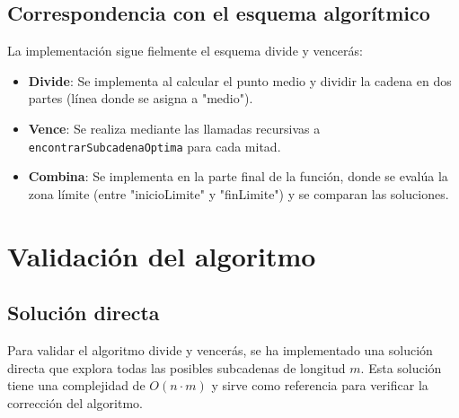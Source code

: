 \documentclass[12pt,a4paper]{article}
\begin{document}
\subsection{Correspondencia con el esquema algorítmico}
La implementación sigue fielmente el esquema divide y vencerás:
\begin{itemize}
    \item \textbf{Divide}: Se implementa al calcular el punto medio y dividir la cadena en dos partes (línea donde se asigna a "medio").
    \item \textbf{Vence}: Se realiza mediante las llamadas recursivas a \texttt{encontrarSubcadenaOptima} para cada mitad.
    \item \textbf{Combina}: Se implementa en la parte final de la función, donde se evalúa la zona límite (entre "inicioLimite" y "finLimite") y se comparan las soluciones.
\end{itemize}

\section{Validación del algoritmo}

\subsection{Solución directa}
Para validar el algoritmo divide y vencerás, se ha implementado una solución directa que explora todas las posibles subcadenas de longitud \( m \). Esta solución tiene una complejidad de \(O(n \cdot m)\) y sirve como referencia para verificar la corrección del algoritmo.
\end{document}

